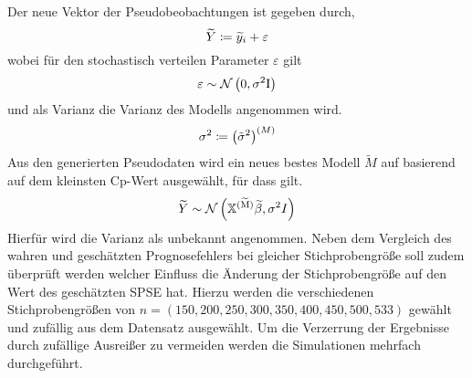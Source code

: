         Der neue Vektor der Pseudobeobachtungen ist gegeben durch,
        \[
            \widetilde{Y} \coloneqq \widetilde{y}_i + \varepsilon
        \]
        wobei für den stochastisch verteilen Parameter $\varepsilon$ gilt
        \[
            \varepsilon \sim \mathcal{N} \left( 0,\sigma^2\mathrm{I} \right)
        \]
        und als Varianz die Varianz des Modells angenommen wird.
        \[
            \sigma^2 \coloneqq \left( \tilde{\sigma}^2 \right)^{(M)}
        \]
        Aus den generierten Pseudodaten wird ein neues bestes Modell $\widetilde{M}$ auf basierend auf dem kleinsten Cp-Wert ausgewählt, für dass gilt.
        \[
            \widetilde{Y} \sim \mathcal{N} \left( \mathbb{X}^{\mathrm{(\widetilde{M})}}\widetilde{\beta}, \sigma^2 I \right)
        \]
        Hierfür wird die Varianz als unbekannt angenommen.
        Neben dem Vergleich des wahren und geschätzten Prognosefehlers bei gleicher Stichprobengröße soll zudem überprüft werden welcher Einfluss die Änderung der Stichprobengröße auf den Wert des geschätzten SPSE hat.
        Hierzu werden die verschiedenen Stichprobengrößen von $n = (150, 200, 250, 300, 350, 400, 450, 500, 533)$ gewählt und zufällig aus dem Datensatz ausgewählt.
        Um die Verzerrung der Ergebnisse durch zufällige Ausreißer zu vermeiden werden die Simulationen mehrfach durchgeführt.


